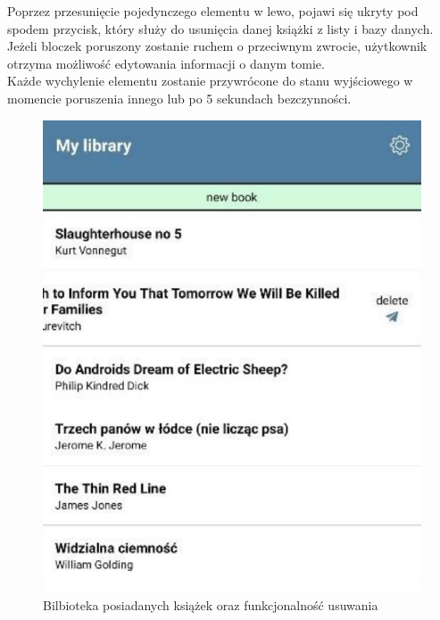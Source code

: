 Poprzez przesunięcie pojedynczego elementu w lewo, pojawi się ukryty pod spodem przycisk, który służy do usunięcia danej książki z listy i bazy danych.\\ Jeżeli bloczek poruszony zostanie ruchem o przeciwnym zwrocie, użytkownik otrzyma możliwość edytowania informacji o danym tomie.\\
Każde wychylenie elementu zostanie przywrócone do stanu wyjściowego w momencie poruszenia innego lub po 5 sekundach bezczynności.
\begin{figure}[H]
	\centering
	\includegraphics{mylib.pdf}
	\caption{Bilbioteka posiadanych książek oraz funkcjonalność usuwania}
\end{figure}
\newpage

